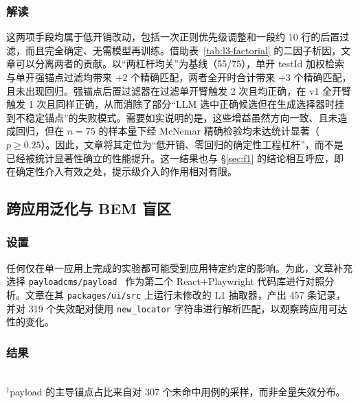 \subsubsection{解读}
这两项手段均属于低开销改动，包括一次正则优先级调整和一段约 10 行的后置过滤，而且完全确定、无需模型再训练。借助表~\ref{tab:l3-factorial} 的二因子析因，文章可以分离两者的贡献。以“两杠杆均关”为基线（55/75），单开 testId 加权检索与单开强锚点过滤均带来 +2 个精确匹配，两者全开时合计带来 +3 个精确匹配，且未出现回归。强锚点后置过滤器在过滤单开臂触发 2 次且均正确，在 v1 全开臂触发 1 次且同样正确，从而消除了部分“LLM 选中正确候选但在生成选择器时挂到不稳定锚点”的失败模式。需要如实说明的是，这些增益虽然方向一致、且未造成回归，但在 $n=75$ 的样本量下经 McNemar 精确检验均未达统计显著（$p\ge0.25$）。因此，文章将其定位为“低开销、零回归的确定性工程杠杆”，而不是已经被统计显著性确立的性能提升。这一结果也与 \S\ref{sec:f1} 的结论相互呼应，即在确定性介入有效之处，提示级介入的作用相对有限。

\subsection{跨应用泛化与 BEM 盲区}
\label{sec:f3}

\subsubsection{设置}
任何仅在单一应用上完成的实验都可能受到应用特定约定的影响。为此，文章补充选择 \texttt{payloadcms/payload}~\cite{payloadCMS} 作为第二个 React+Playwright 代码库进行对照分析。文章在其 \texttt{packages/ui/src} 上运行未修改的 L1 抽取器，产出 457 条记录，并对 319 个失效配对使用 \texttt{new\_locator} 字符串进行解析匹配，以观察跨应用可达性的变化。

\subsubsection{结果}
\begin{table}[t]
\centering
\caption{跨应用 L1 可达率（\S\ref{sec:f3}）。原始下降是真实的，但成因可诊断。}
\label{tab:cross-app}
\small
{}
\\[2pt]
{\scriptsize $^\dagger$payload 的主导锚点占比来自对 307 个未命中用例的采样，而非全量失效分布。}
\end{table}

